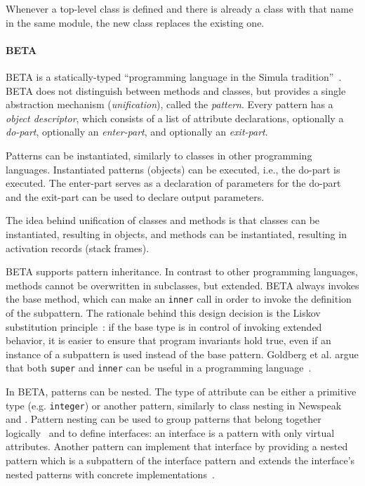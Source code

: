 Whenever a top-level class is defined and there is already a class with that name in the same module, the new class replaces the existing one.

\paragraph{BETA}
BETA is a statically-typed ``programming language in the Simula tradition''~\cite{LehrmannMadsen:1993:OPB:221048, Kristensen:2007:WWB:1238844.1238854}. BETA does not distinguish between methods and classes, but provides a single abstraction mechanism (\emph{unification}), called the \emph{pattern}. Every pattern has a \emph{object descriptor}, which consists of a list of attribute declarations, optionally a \emph{do-part}, optionally an \emph{enter-part}, and optionally an \emph{exit-part}. 

Patterns can be instantiated, similarly to classes in other programming languages. Instantiated patterns (objects) can be executed, i.e., the do-part is executed. The enter-part serves as a declaration of parameters for the do-part and the exit-part can be used to declare output parameters.

The idea behind unification of classes and methods is that classes can be instantiated, resulting in objects, and methods can be instantiated, resulting in activation records (stack frames).

BETA supports pattern inheritance. In contrast to other programming languages, methods cannot be overwritten in subclasses, but extended. BETA always invokes the base method, which can make an \texttt{inner} call in order to invoke the definition of the subpattern. The rationale behind this design decision is the Liskov substitution principle~\cite{Liskov:1994:BNS:197320.197383}: if the base type is in control of invoking extended behavior, it is easier to ensure that program invariants hold true, even if an instance of a subpattern is used instead of the base pattern. Goldberg et al. argue that both \texttt{super} and \texttt{inner} can be useful in a programming language~\cite{OOPSLA-2004-GoldbergFF}.

In BETA, patterns can be nested. The type of attribute can be either a primitive type (e.g. \texttt{integer}) or another pattern, similarly to class nesting in Newspeak and \msname. Pattern nesting can be used to group patterns that belong together logically~\cite{abstrAndModBETA} and to define interfaces: an interface is a pattern with only virtual attributes. Another pattern can implement that interface by providing a nested pattern which is a subpattern of the interface pattern and extends the interface's nested patterns with concrete implementations~\cite{betaTowardsUnified}.

